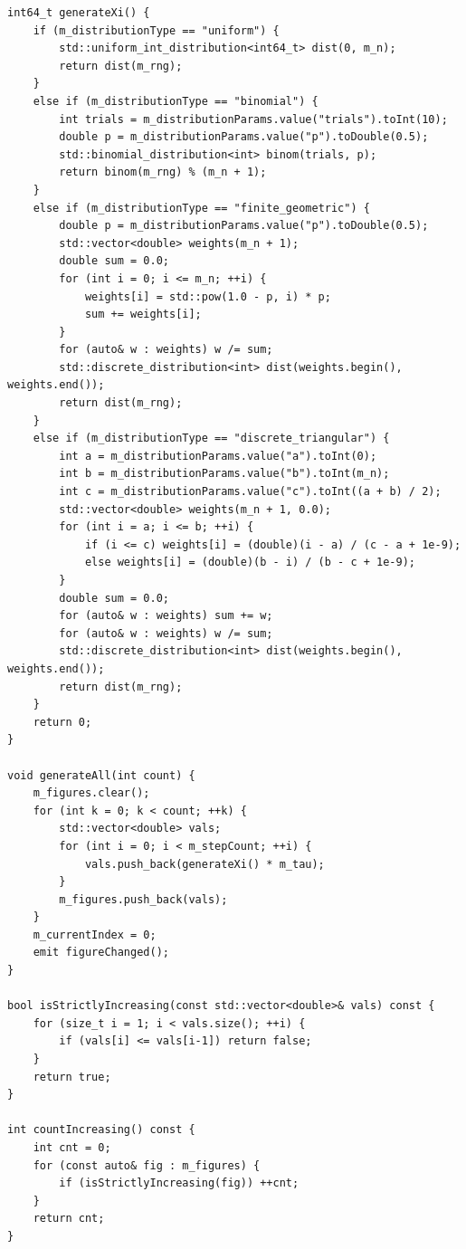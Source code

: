 \documentclass[a4paper]{article}
\theoremstyle{definition}
\begin{document}
\begin{lstlisting}[caption={Основной алгоритм генерации ступенчатых фигур}, label=lst6]
int64_t generateXi() {
    if (m_distributionType == "uniform") {
        std::uniform_int_distribution<int64_t> dist(0, m_n);
        return dist(m_rng);
    }
    else if (m_distributionType == "binomial") {
        int trials = m_distributionParams.value("trials").toInt(10);
        double p = m_distributionParams.value("p").toDouble(0.5);
        std::binomial_distribution<int> binom(trials, p);
        return binom(m_rng) % (m_n + 1);
    }
    else if (m_distributionType == "finite_geometric") {
        double p = m_distributionParams.value("p").toDouble(0.5);
        std::vector<double> weights(m_n + 1);
        double sum = 0.0;
        for (int i = 0; i <= m_n; ++i) {
            weights[i] = std::pow(1.0 - p, i) * p;
            sum += weights[i];
        }
        for (auto& w : weights) w /= sum;
        std::discrete_distribution<int> dist(weights.begin(), weights.end());
        return dist(m_rng);
    }
    else if (m_distributionType == "discrete_triangular") {
        int a = m_distributionParams.value("a").toInt(0);
        int b = m_distributionParams.value("b").toInt(m_n);
        int c = m_distributionParams.value("c").toInt((a + b) / 2);
        std::vector<double> weights(m_n + 1, 0.0);
        for (int i = a; i <= b; ++i) {
            if (i <= c) weights[i] = (double)(i - a) / (c - a + 1e-9);
            else weights[i] = (double)(b - i) / (b - c + 1e-9);
        }
        double sum = 0.0;
        for (auto& w : weights) sum += w;
        for (auto& w : weights) w /= sum;
        std::discrete_distribution<int> dist(weights.begin(), weights.end());
        return dist(m_rng);
    }
    return 0;
}

void generateAll(int count) {
    m_figures.clear();
    for (int k = 0; k < count; ++k) {
        std::vector<double> vals;
        for (int i = 0; i < m_stepCount; ++i) {
            vals.push_back(generateXi() * m_tau);
        }
        m_figures.push_back(vals);
    }
    m_currentIndex = 0;
    emit figureChanged();
}

bool isStrictlyIncreasing(const std::vector<double>& vals) const {
    for (size_t i = 1; i < vals.size(); ++i) {
        if (vals[i] <= vals[i-1]) return false;
    }
    return true;
}

int countIncreasing() const {
    int cnt = 0;
    for (const auto& fig : m_figures) {
        if (isStrictlyIncreasing(fig)) ++cnt;
    }
    return cnt;
}
\end{lstlisting}
\end{document}

